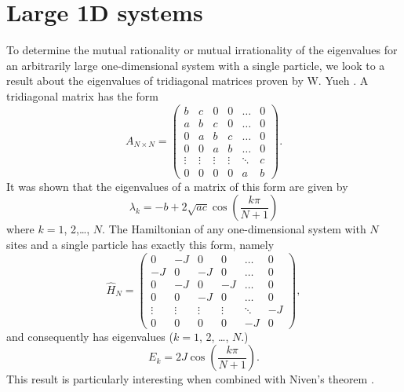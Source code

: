 \documentclass[a4paper,10pt]{article}
\theoremstyle{plain}
\begin{document}
\section{Large 1D systems}

To determine the mutual rationality or mutual irrationality of the eigenvalues for
an arbitrarily large one-dimensional system with a single particle, we look to a
result about the eigenvalues of tridiagonal matrices proven by W. Yueh
\cite{Yueh2006}. A tridiagonal matrix has the form
\begin{equation}
    A_{N \times N}
    =
    \begin{pmatrix}
             b &      c &     0  &      0 &  \dots & 0 \\
             a &      b &     c  &      0 &  \dots & 0 \\
             0 &      a &     b  &      c &  \dots & 0 \\
             0 &      0 &     a  &      b &  \dots & 0 \\
        \vdots & \vdots & \vdots & \vdots & \ddots & c \\
             0 &      0 &     0  &      0 &      a & b
    \end{pmatrix}.
\end{equation}
It was shown that the eigenvalues of a matrix of this form are given by
\begin{equation}
\label{tridiagonal_eigenvalues_formula}
    \lambda_{k} = -b + 2 \sqrt{ac} \cos{\!\left( \frac{k \pi}{N+1} \right )}
\end{equation}
where $k=1$, 2,\dots, $N$. The Hamiltonian of any one-dimensional system with
$N$ sites and a single particle has exactly this form, namely
\begin{equation}
    \hat{H}_{N}
    =
    \begin{pmatrix}
         0 &     -J &     0  &      0 &  \dots &  0 \\
        -J &      0 &    -J  &      0 &  \dots &  0 \\
         0 &     -J &     0  &     -J &  \dots &  0 \\
         0 &      0 &    -J  &      0 &  \dots &  0 \\
    \vdots & \vdots & \vdots & \vdots & \ddots & -J \\
         0 &      0 &     0  &      0 &     -J &  0
    \end{pmatrix},
\end{equation}
and consequently has eigenvalues ($k=1$, 2, \dots, $N$.)
\begin{equation}
    \label{1D_eigenvalues}
    E_{k} = 2 J \cos{\!\left( \frac{k \pi}{N+1} \right)}.
\end{equation}
This result is particularly interesting when combined with Niven's theorem
\cite{DoubleIvan}.
\end{document}
